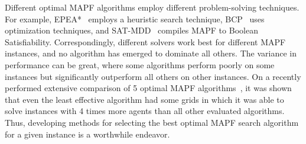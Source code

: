 \documentclass[letterpaper]{article} %
\newcommand{\shortcite}[1]{\cite{#1}}
\begin{document}
Different optimal MAPF algorithms employ different problem-solving techniques. For example, EPEA*~\cite{goldenberg2014enhanced} employs a heuristic search technique, BCP~\cite{lam2022branch} uses optimization techniques, and SAT-MDD~\cite{surynek2016efficient} compiles MAPF to Boolean Satisfiability.
Correspondingly, different solvers work best for different MAPF instances, and no algorithm has emerged to dominate all others.
The variance in performance can be great, where some algorithms perform poorly on some instances but significantly outperform all others on other instances.
On a recently performed extensive comparison of 5 optimal MAPF algorithms~\cite{kaduri2021experimental}, it was shown that even the least effective algorithm had some grids in which it was able to solve instances with 4 times more agents than all other evaluated algorithms. %
Thus, developing methods for selecting the best optimal MAPF search algorithm for a given instance is a worthwhile endeavor. %


\end{document}
